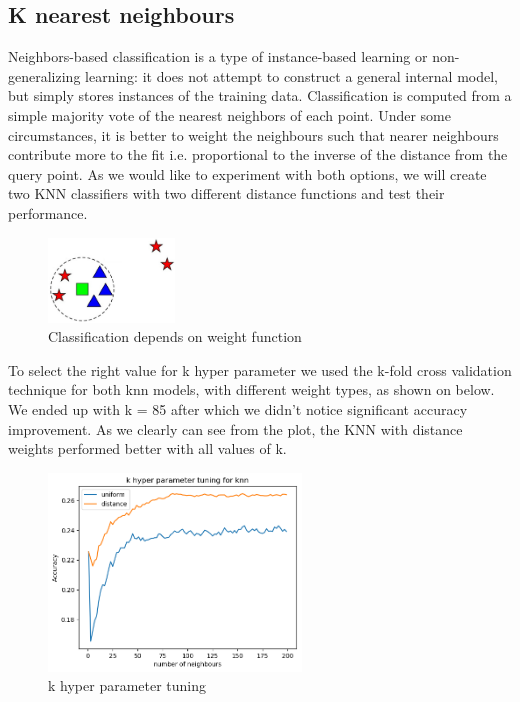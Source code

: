 \documentclass[12pt]{article}
\begin{document}
\subsection{K nearest neighbours}
Neighbors-based classification is a type of instance-based learning or non-generalizing learning: it does not attempt to construct a general internal model, but simply stores instances of the training data. Classification is computed from a simple majority vote of the nearest neighbors of each point. Under some circumstances, it is better to weight the neighbours such that nearer neighbours contribute more to the fit i.e. proportional to the inverse of the distance from the query point. As we would like to experiment with both options, we will create two KNN classifiers with two different distance functions and test their performance.
\begin{figure}[h]
\centering
\includegraphics[width=0.3\textwidth]{report_pics/knn}
\caption{Classification depends on weight function}
\end{figure}
To select the right value for k hyper parameter we used the k-fold cross validation technique for both knn models, with different weight types, as shown on below. We ended up with k = 85 after which we didn't notice significant accuracy improvement. As we clearly can see from the plot, the KNN with distance weights performed better with all values of k.
\begin{figure}[h]
\centering
\includegraphics[width=0.6\textwidth]{Cross_valid_plots/k_hyper_fig}
\caption{k hyper parameter tuning}
\end{figure}
\end{document}
